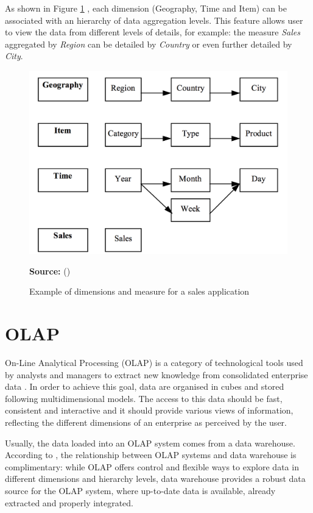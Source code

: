 As shown in Figure \ref{fig:figure2} , each dimension (Geography, Time and Item) can be associated with an hierarchy of data aggregation levels. This feature allows user to view the data from different levels of details, for example: the measure \emph{Sales} aggregated by \emph{Region} can be detailed by \emph{Country} or even further detailed by \emph{City}.

\begin{figure}[ht]
\centering
\caption{Example of dimensions and measure for a sales application}
\label{fig:figure2}
\includegraphics[width=.6\textwidth]{images/dimensions_measures_example.png}
\par\medskip\ABNTEXfontereduzida\selectfont\textbf{Source:} \citeauthor{Vassiliadis1998} (\citeyear{Vassiliadis1998}) \par\medskip
\end{figure}

\section{OLAP}
On-Line Analytical Processing (OLAP) is a category of technological tools used by analysts and managers to extract new knowledge from consolidated enterprise data \cite{OLAPCouncil}. In order to achieve this goal, data are organised in cubes and stored following multidimensional models. The access to this data should be fast, consistent and interactive and it should provide various views of information, reflecting the different dimensions of an enterprise as perceived by the user.

Usually, the data loaded into an OLAP system comes from a data warehouse. According to \cite{Inmon2005}, the relationship between OLAP systems and data warehouse is complimentary: while OLAP offers control and flexible ways to explore data in different dimensions and hierarchy levels, data warehouse provides a robust data source for the OLAP system, where up-to-date data is available, already extracted and properly integrated.


